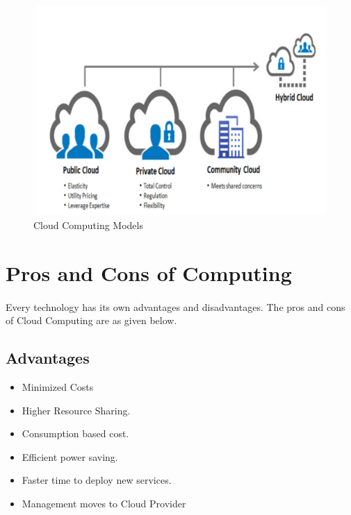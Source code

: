 \begin{figure}[htb]
\centering
\includegraphics[width=12cm,height=8cm]{5-contents/1-Introduction/images/cloud-computing-model.png} %
\caption{Cloud Computing Models}
\label{fig:label} %
\end{figure}

\section{Pros and Cons of Computing}
\paragraph{\hspace{24pt}}
Every technology has its own advantages and disadvantages. The pros and cons of Cloud Computing are as given below.

\subsection{Advantages}
\begin{itemize}
    \item Minimized Costs
    \item Higher Resource Sharing.
    \item Consumption based cost.
    \item Efficient power saving.
    \item Faster time to deploy new services.
    \item Management moves to Cloud Provider
\end{itemize}

